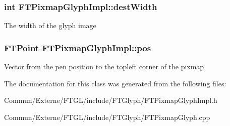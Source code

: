 \subsubsection[{\texorpdfstring{dest\+Width}{destWidth}}]{\setlength{\rightskip}{0pt plus 5cm}int F\+T\+Pixmap\+Glyph\+Impl\+::dest\+Width\hspace{0.3cm}{\ttfamily [private]}}\hypertarget{class_f_t_pixmap_glyph_impl_a04c6246e9f35ac10b8c994d998f5b8c7}{}\label{class_f_t_pixmap_glyph_impl_a04c6246e9f35ac10b8c994d998f5b8c7}
The width of the glyph \textquotesingle{}image\textquotesingle{} 
\subsubsection[{\texorpdfstring{pos}{pos}}]{\setlength{\rightskip}{0pt plus 5cm}F\+T\+Point F\+T\+Pixmap\+Glyph\+Impl\+::pos\hspace{0.3cm}{\ttfamily [private]}}\hypertarget{class_f_t_pixmap_glyph_impl_a51d15a72172389c6f50c2ae5a023044a}{}\label{class_f_t_pixmap_glyph_impl_a51d15a72172389c6f50c2ae5a023044a}
Vector from the pen position to the topleft corner of the pixmap 

The documentation for this class was generated from the following files\+:\begin{DoxyCompactItemize}
\item 
Commun/\+Externe/\+F\+T\+G\+L/include/\+F\+T\+Glyph/F\+T\+Pixmap\+Glyph\+Impl.\+h\item 
Commun/\+Externe/\+F\+T\+G\+L/include/\+F\+T\+Glyph/F\+T\+Pixmap\+Glyph.\+cpp\end{DoxyCompactItemize}
